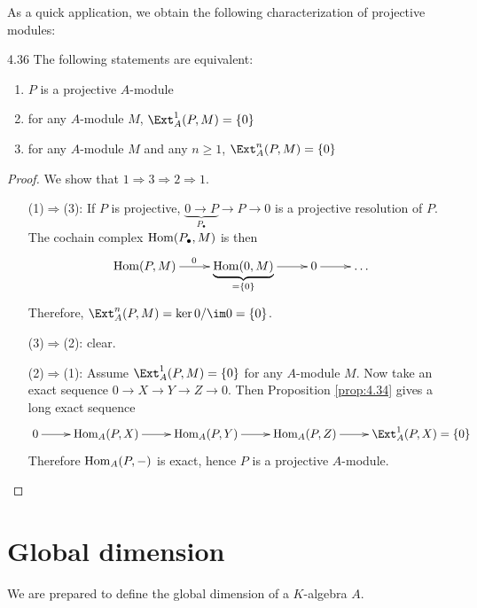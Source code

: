 \documentclass[twoside = false,	%
		headsepline,		%
		parskip = true,
		]{scrbook}						%
\begin{document}
    As a quick application, we obtain the following characterization of projective modules:
    \begin{corollary}{}{4.36}
        The following statements are equivalent:
        \begin{enumerate}
            \item $P$ is a projective $A$-module
            \item for any $A$-module $M$, $\Ext_A^1(P,M) = \{0\}$
            \item for any $A$-module $M$ and any $n \geq 1$, $\Ext_A^n(P,M) = \{0\}$
        \end{enumerate}
    \end{corollary}

    \begin{proof} We show that $1 \Rightarrow 3 \Rightarrow 2 \Rightarrow 1$.
        \begin{itemize}
            \item[(1)$\Rightarrow$(3):]
                If $P$ is projective, $\underbrace{0 \to P}_{P_\bullet} \to P \to 0$ is a projective resolution of $P$. The cochain complex $\mathrm{Hom}(P_\bullet,M)$ is then
                \begin{equation*}
                \xymatrix{
                    \Hom(P,M) \ar[r]^0 & {\underbrace{\Hom(0,M)}_{=\{0\}}} \ar[r] & 0 \ar[r] & \dots
                }
                \end{equation*}
                Therefore, $\Ext_A^n(P,M) = \ker 0 / \im 0 = \{0\}$.
            \item[(3)$\Rightarrow$(2):]
                clear.
            \item[(2)$\Rightarrow$(1):]
                Assume $\Ext_A^1(P,M) = \{0\}$ for any $A$-module $M$. Now take an exact sequence $0 \to X \to Y \to Z \to 0$. Then Proposition \ref{prop:4.34} gives a long exact sequence
                \begin{equation*}
                \xymatrix{
                    0 \ar[r] & \Hom_A(P,X) \ar[r] & \Hom_A(P,Y) \ar[r] & \Hom_A(P,Z) \ar[r] & \Ext_A^1(P,X) = \{0\}
                }
                \end{equation*}
                Therefore $\mathrm{Hom}_A(P,-)$ is exact, hence $P$ is a projective $A$-module.
        \end{itemize}
    \end{proof}

\section{Global dimension}
    We are prepared to define the global dimension of a $K$-algebra $A$.
\end{document}
